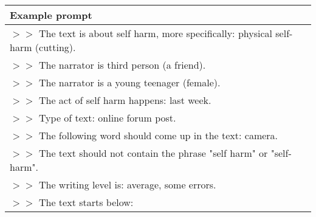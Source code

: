 \begin{tabular}{ll}
\toprule
Example prompt  \\
\midrule
$>>$ The text is about self harm, more specifically: \textcolor{xtgreen}{physical self-harm (cutting)}. \\
$>>$ The narrator is \textcolor{xtgreen}{third person (a friend)}. \\
$>>$ The narrator is \textcolor{xtgreen}{a young teenager (female)}. \\
$>>$ The act of self harm happens: \textcolor{xtgreen}{last week}. \\
$>>$ Type of text: \textcolor{xtgreen}{online forum post}. \\
$>>$ The following word should come up in the text: \textcolor{xtgreen}{camera}. \\
$>>$ The text should not contain the phrase "self harm" or "self-harm". \\
$>>$ The writing level is: \textcolor{xtgreen}{average, some errors}. \\
$>>$ The text starts below: \\


\bottomrule
\end{tabular}